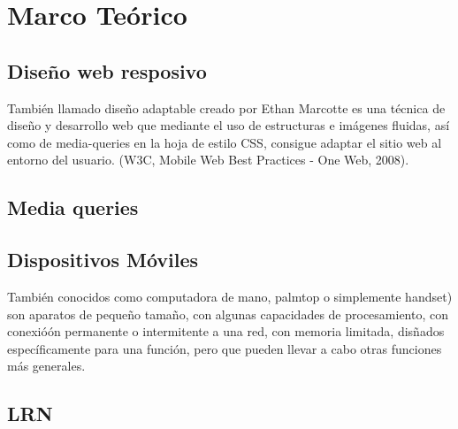 
\chapter{Marco Te\'orico}

\section{Dise\~no web resposivo}
Tambi\'en llamado dise\~no adaptable creado por Ethan Marcotte es una t\'ecnica de dise\~no y desarrollo web que mediante el uso de estructuras e im\'agenes fluidas, as\'i como de media-queries en la hoja de estilo CSS, consigue adaptar el sitio web al entorno del usuario. (W3C, Mobile Web Best Practices - One Web, 2008).

\section{Media queries}

\section{Dispositivos M\'oviles}
Tambi\'en conocidos como computadora de mano, palmtop o simplemente handset) son aparatos de peque\~no tama\~no, con algunas capacidades de procesamiento, con conexió\'on permanente o intermitente a una red, con memoria limitada, dis\~nados espec\'ificamente para una funci\'on, pero que pueden llevar a cabo otras funciones m\'as generales.

\section{LRN}